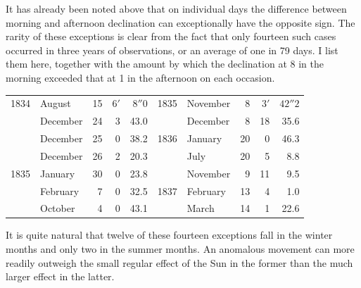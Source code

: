 It has already been noted above that on individual days the difference between morning and afternoon declination can exceptionally have the opposite sign. The rarity of these exceptions is clear from the fact that only fourteen such cases occurred in three years of observations, or an average of one in 79 days. I list them here, together with the amount by which the declination at 8 in the morning exceeded that at 1 in the afternoon on each occasion.
\begin{center}\small
\begin{tabular}{rlr|rr||rlr|rr}
1834&August&15&$6'$&$8''0$&1835&November&8&$3'$&$42''2$\\
&December&24&3&43.0&&December&8&18&35.6\\
&December&25&0&38.2&1836&January&20&0&46.3\\
&December&26&2&20.3&&July&20&5&8.8\\
1835&January&30&0&23.8&&November&9&11&9.5\\
&February&7&0&32.5&1837&February&13&4&1.0\\
&October&4&0&43.1&&March&14&1&22.6
\end{tabular}
\end{center}
It is quite natural that twelve of these fourteen exceptions fall in the winter months and only two in the summer months. An anomalous movement can more readily outweigh the small
regular effect of the Sun in the former than the much larger effect in the latter.

